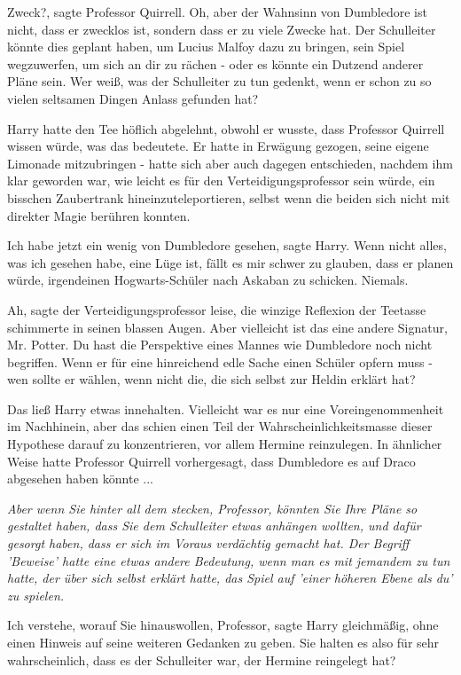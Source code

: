 \glqq{}Zweck?\grqq{}, sagte Professor Quirrell. \glqq{}Oh, aber der Wahnsinn von
Dumbledore ist nicht, dass er zwecklos ist, sondern dass er zu viele Zwecke hat.
Der Schulleiter könnte dies geplant haben, um Lucius Malfoy dazu zu bringen,
sein Spiel wegzuwerfen, um sich an dir zu rächen - oder es könnte ein Dutzend
anderer Pläne sein. Wer weiß, was der Schulleiter zu tun gedenkt, wenn er schon
zu so vielen seltsamen Dingen Anlass gefunden hat?\grqq{}

Harry hatte den Tee höflich abgelehnt, obwohl er wusste, dass Professor Quirrell
wissen würde, was das bedeutete. Er hatte in Erwägung gezogen, seine eigene
Limonade mitzubringen - hatte sich aber auch dagegen entschieden, nachdem ihm
klar geworden war, wie leicht es für den Verteidigungsprofessor sein würde, ein
bisschen Zaubertrank hineinzuteleportieren, selbst wenn die beiden sich nicht
mit direkter Magie berühren konnten.

\glqq{}Ich habe jetzt ein wenig von Dumbledore gesehen\grqq{}, sagte Harry. \glqq{}
Wenn nicht alles, was ich gesehen habe, eine Lüge ist, fällt es mir schwer zu
glauben, dass er planen würde, irgendeinen Hogwarts-Schüler nach Askaban zu
schicken. Niemals.\grqq{}

\glqq{}Ah\grqq{}, sagte der Verteidigungsprofessor leise, die winzige Reflexion
der Teetasse schimmerte in seinen blassen Augen. \glqq{}Aber vielleicht ist das
eine andere Signatur, Mr. Potter. Du hast die Perspektive eines Mannes wie
Dumbledore noch nicht begriffen. Wenn er für eine hinreichend edle Sache einen
Schüler opfern muss - wen sollte er wählen, wenn nicht die, die sich selbst zur
Heldin erklärt hat?\grqq{}

Das ließ Harry etwas innehalten. Vielleicht war es nur eine Voreingenommenheit
im Nachhinein, aber das schien einen Teil der Wahrscheinlichkeitsmasse dieser
Hypothese darauf zu konzentrieren, vor allem Hermine reinzulegen. In ähnlicher
Weise hatte Professor Quirrell vorhergesagt, dass Dumbledore es auf Draco
abgesehen haben könnte ...

\emph{Aber wenn Sie hinter all dem stecken, Professor, könnten Sie Ihre Pläne so
gestaltet haben, dass Sie dem Schulleiter etwas anhängen wollten, und dafür
gesorgt haben, dass er sich im Voraus verdächtig gemacht hat. Der Begriff
'Beweise' hatte eine etwas andere Bedeutung, wenn man es mit jemandem zu tun
hatte, der über sich selbst erklärt hatte, das Spiel auf 'einer höheren Ebene
als du' zu spielen.}

\glqq{}Ich verstehe, worauf Sie hinauswollen, Professor\grqq{}, sagte Harry
gleichmäßig, ohne einen Hinweis auf seine weiteren Gedanken zu geben. \glqq{}Sie
halten es also für sehr wahrscheinlich, dass es der Schulleiter war, der Hermine
reingelegt hat?\grqq{}

